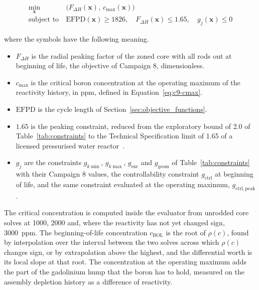 \begin{equation}
\begin{aligned}
\min_{\mathbf{x}}\ &\big(F_{\Delta H}(\mathbf{x}),\ c_\mathrm{max}(\mathbf{x})\big) \\
\text{subject to}\ &\mathrm{EFPD}(\mathbf{x}) \ge 1826,\quad
F_{\Delta H}(\mathbf{x}) \le 1.65,\quad g_j(\mathbf{x}) \le 0
\end{aligned}
\label{eq:c9-problem}
\end{equation}

\noindent where the symbols have the following meaning.

\begin{itemize}
  \item $F_{\Delta H}$ is the radial peaking factor of the zoned core
        with all rods out at beginning of life, the objective of
        Campaign 8, dimensionless.

  \item $c_\mathrm{max}$ is the critical boron concentration at the
        operating maximum of the reactivity history, in ppm, defined in
        Equation~\eqref{eq:c9-cmax}.

  \item $\mathrm{EFPD}$ is the cycle length of
        Section~\ref{sec:objective_functions}.

  \item $1.65$ is the peaking constraint, reduced from the exploratory
        bound of 2.0 of Table~\ref{tab:constraints} to the Technical
        Specification limit of 1.65 of a licensed pressurised water
        reactor~\cite{robinson_gd10}.

  \item $g_j$ are the constraints $g_{k\min}$, $g_{k\max}$,
        $g_\mathrm{enr}$ and $g_\mathrm{geom}$ of
        Table~\ref{tab:constraints} with their Campaign 8 values, the
        controllability constraint $g_\mathrm{ctrl}$ at beginning of life, and the
        same constraint evaluated at the operating maximum,
        $g_\mathrm{ctrl,peak}$.
\end{itemize}

The critical concentration is computed inside the evaluator from
unrodded core solves at 1000, 2000 and, where the reactivity has not
yet changed sign, \SI{3000}{ppm}. The beginning-of-life concentration
$c_\mathrm{BOL}$ is the root of $\rho(c)$, found by interpolation
over the interval between the two solves across which $\rho(c)$
changes sign, or by extrapolation above the highest,
and the differential worth is its local slope at that root. The
concentration at the operating maximum adds the part of the gadolinium
hump that the boron has to hold, measured on the assembly depletion
history as a difference of reactivity.

